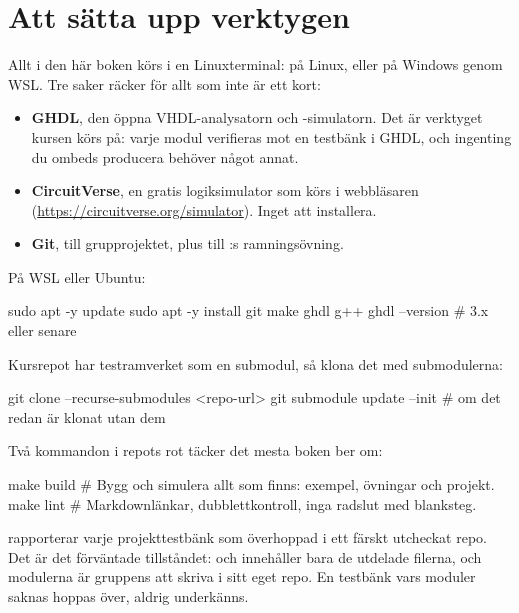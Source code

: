 \section*{Att sätta upp verktygen}
Allt i den här boken körs i en Linuxterminal: på Linux, eller på Windows genom WSL. Tre saker
räcker för allt som inte är ett kort:

\begin{itemize}
  \item \textbf{GHDL}, den öppna VHDL-analysatorn och -simulatorn. Det är verktyget kursen körs
    på: varje modul verifieras mot en testbänk i GHDL, och ingenting du ombeds producera behöver
    något annat.
  \item \textbf{CircuitVerse}, en gratis logiksimulator som körs i webbläsaren
    (\url{https://circuitverse.org/simulator}). Inget att installera.
  \item \textbf{Git}, till grupprojektet, plus  till :s ramningsövning.
\end{itemize}

\noindent På WSL eller Ubuntu:

\begin{shell}
sudo apt -y update
sudo apt -y install git make ghdl g++
ghdl --version           # 3.x eller senare
\end{shell}

\noindent Kursrepot har testramverket som en submodul, så klona det med submodulerna:

\begin{shell}
git clone --recurse-submodules <repo-url>
git submodule update --init       # om det redan är klonat utan dem
\end{shell}

\noindent Två kommandon i repots rot täcker det mesta boken ber om:

\begin{shell}
make build               # Bygg och simulera allt som finns: exempel, övningar och projekt.
make lint                # Markdownlänkar, dubblettkontroll, inga radslut med blanksteg.
\end{shell}

\noindent{} rapporterar varje projekttestbänk som överhoppad i ett färskt
utcheckat repo. Det är det förväntade tillståndet:  och 
innehåller bara de utdelade filerna, och modulerna är gruppens att skriva i sitt eget repo. En
testbänk vars moduler saknas hoppas över, aldrig underkänns.

